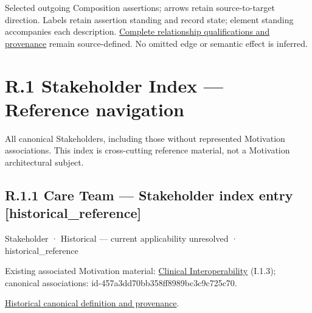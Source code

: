 \begin{center}
\end{center}
{\small Selected outgoing Composition assertions; arrows retain source-to-target direction. Labels retain assertion standing and record state; element standing accompanies each description. \href{structure.json}{Complete relationship qualifications and provenance} remain source-defined. No omitted edge or semantic effect is inferred.}\par
\chapter*{R.1 Stakeholder Index — Reference navigation}
\label{navigation:R.1}

All canonical Stakeholders, including those without represented Motivation associations. This index is cross-cutting reference material, not a Motivation architectural subject.\par
\section*{R.1.1 Care Team — Stakeholder index entry [historical\_reference]}
\label{navigation:R.1.1}

\label{element:6f5a203d81e24a81b384a80781987daa}
{\small Stakeholder · Historical — current applicability unresolved · historical\_reference}\par
{\small Existing associated Motivation material: \hyperref[element:babb9f5d63d8435890c1db3579ec78d9]{Clinical Interoperability} (I.1.3); canonical associations: id-457a3dd70bb358ff8989bc3c9c725c70.}\par
\href{../../../../continuum/motivation/stakeholder/6f5a203d81e24a81b384a80781987daa.md}{Historical canonical definition and provenance}.\par
